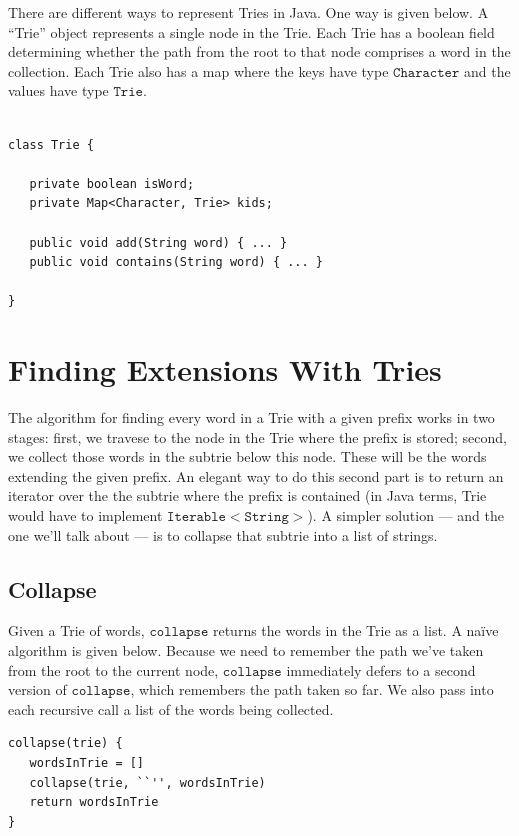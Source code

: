 \documentclass[a4paper,12pt]{article}
\newcommand{\kwa}[1]{\mathtt{#1}}
\begin{document}
\noindent
There are different ways to represent Tries in Java. One way is given below. A ``Trie'' object represents a single node in the Trie. Each Trie has a boolean field determining whether the path from the root to that node comprises a word in the collection. Each Trie also has a map where the keys have type $\kwa{Character}$ and the values have type $\kwa{Trie}$.

\begin{lstlisting}

class Trie {

   private boolean isWord;
   private Map<Character, Trie> kids;

   public void add(String word) { ... }
   public void contains(String word) { ... }

}

\end{lstlisting}


\section{Finding Extensions With Tries}

The algorithm for finding every word in a Trie with a given prefix works in two stages: first, we travese to the node in the Trie where the prefix is stored; second, we collect those words in the subtrie below this node. These will be the words extending the given prefix. An elegant way to do this second part is to return an iterator over the the subtrie where the prefix is contained (in Java terms, Trie would have to implement $\kwa{Iterable<String>}$). A simpler solution --- and the one we'll talk about --- is to collapse that subtrie into a list of strings.

\subsection{Collapse}

Given a Trie of words, $\kwa{collapse}$ returns the words in the Trie as a list. A naïve algorithm is given below. Because we need to remember the path we've taken from the root to the current node, $\kwa{collapse}$ immediately defers to a second version of $\kwa{collapse}$, which remembers the path taken so far. We also pass into each recursive call a list of the words being collected.

\begin{lstlisting}
collapse(trie) {
   wordsInTrie = []
   collapse(trie, ``'', wordsInTrie)
   return wordsInTrie
}
\end{lstlisting}
\end{document}
